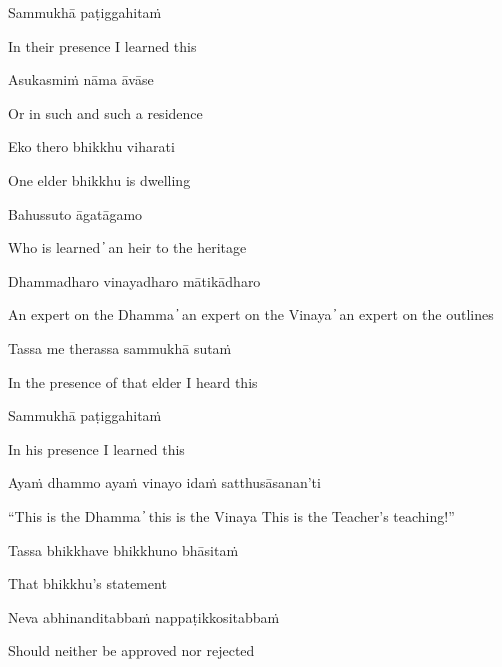 Sammukhā paṭiggahitaṁ

\begin{cprenglish}
  In their presence I learned this
\end{cprenglish}

Asukasmiṁ nāma āvāse

\begin{cprenglish}
  Or in such and such a residence
\end{cprenglish}

Eko thero bhikkhu viharati

\begin{cprenglish}
  One elder bhikkhu is dwelling
\end{cprenglish}

Bahussuto āgatāgamo

\begin{cprenglish}
  Who is learned  ̓  an heir to the heritage
\end{cprenglish}

Dhammadharo vinayadharo mātikādharo

\begin{cprenglish}
  An expert on the Dhamma  ̓  an expert on the Vinaya  ̓  an expert on the outlines
\end{cprenglish}

Tassa me therassa sammukhā sutaṁ

\begin{cprenglish}
  In the presence of that elder I heard this
\end{cprenglish}

Sammukhā paṭiggahitaṁ

\begin{cprenglish}
  In his presence I learned this
\end{cprenglish}

Ayaṁ dhammo ayaṁ vinayo idaṁ satthusāsanan’ti

\begin{cprenglish}
  “This is the Dhamma  ̓  this is the Vinaya
  This is the Teacher’s teaching!”
\end{cprenglish}

Tassa bhikkhave bhikkhuno bhāsitaṁ

\begin{cprenglish}
  That bhikkhu’s statement
\end{cprenglish}

Neva abhinanditabbaṁ nappaṭikkositabbaṁ

\begin{cprenglish}
  Should neither be approved nor rejected
\end{cprenglish}

